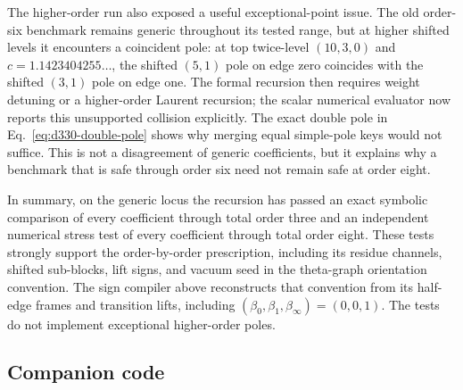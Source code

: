 \documentclass[11pt]{article}
\begin{document}
The higher-order run also exposed a useful exceptional-point issue.  The
old order-six benchmark remains generic throughout its tested range, but at
higher shifted levels it encounters a coincident pole: at top twice-level
\((10,3,0)\) and \(c=1.1423404255\ldots\), the shifted \((5,1)\) pole on edge
zero coincides with the shifted \((3,1)\) pole on edge one.  The formal
recursion then requires weight detuning or a higher-order Laurent recursion;
the scalar numerical evaluator now reports this unsupported collision
explicitly.  The exact double pole in Eq.~\eqref{eq:d330-double-pole} shows
why merging equal simple-pole keys would not suffice.
This is not a disagreement of generic coefficients, but it explains why a
benchmark that is safe through order six need not remain safe at order
eight.

In summary, on the generic locus the recursion has passed an exact symbolic
comparison of every coefficient through total order three and an independent
numerical stress test of every coefficient through total order eight.  These
tests strongly support the order-by-order prescription, including its residue
channels, shifted sub-blocks, lift signs, and vacuum seed in the theta-graph
orientation convention.  The sign compiler above reconstructs that
convention from its half-edge frames and transition lifts, including
\((\beta_0,\beta_1,\beta_\infty)=(0,0,1)\).  The tests do not implement
exceptional higher-order poles.


\subsection{Companion code}
\end{document}
